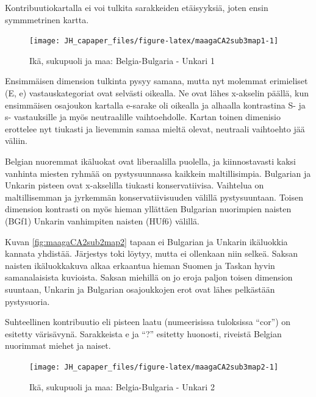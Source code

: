 \documentclass[
  finnish,
]{book}
\begin{document}
Kontribuutiokartalla ei voi tulkita sarakkeiden etäisyyksiä, joten ensin symmmetrinen kartta.

\begin{figure}

{\centering \texttt{[image: JH\_capaper\_files/figure-latex/maagaCA2sub3map1-1]} 

}

\caption{Ikä, sukupuoli ja maa: Belgia-Bulgaria - Unkari 1}\label{fig:maagaCA2sub3map1}
\end{figure}

Ensimmäisen dimension tulkinta pysyy samana, mutta nyt molemmat erimieliset
(E, e) vastauskategoriat ovat selvästi oikealla. Ne ovat lähes x-akselin päällä,
kun ensimmäisen osajoukon kartalla e-sarake oli oikealla ja alhaalla kontrastina
S- ja s- vastauksille ja myös neutraalille vaihtoehdolle. Kartan toinen dimenisio
erottelee nyt tiukasti ja lievemmin samaa mieltä olevat, neutraali vaihtoehto
jää väliin.

Belgian nuoremmat ikäluokat ovat liberaalilla puolella, ja kiinnostavasti
kaksi vanhinta miesten ryhmää on pystysuunnassa kaikkein maltillisimpia.
Bulgarian ja Unkarin pisteen ovat x-akselilla tiukasti konservatiivisa.
Vaihtelua on maltillisemman ja jyrkemmän konservatiivisuuden välillä
pystysuuntaan. Toisen dimension kontrasti on myös hieman yllättäen
Bulgarian nuorimpien naisten (BGf1) Unkarin vanhimpiten naisten (HUf6)
välillä.

Kuvan \ref{fig:maagaCA2sub2map2} tapaan ei Bulgarian ja Unkarin
ikäluokkia kannata yhdistää. Järjestys toki löytyy, mutta ei ollenkaan
niin selkeä. Saksan naisten ikäluokkakuva alkaa erkaantua hieman Suomen ja Taskan
hyvin samanalaisista kuvioista. Saksan miehillä on jo eroja paljon toisen
dimension suuntaan, Unkarin ja Bulgarian osajoukkojen erot ovat lähes
pelkästään pystysuoria.

Suhteellinen kontribuutio eli pisteen laatu (numeerisissa
tuloksissa ``cor'') on esitetty värisävynä. Sarakkeista e ja ``?'' esitetty
huonosti, riveistä Belgian nuorimmat miehet ja naiset.

\begin{figure}

{\centering \texttt{[image: JH\_capaper\_files/figure-latex/maagaCA2sub3map2-1]} 

}

\caption{Ikä, sukupuoli ja maa: Belgia-Bulgaria - Unkari 2}\label{fig:maagaCA2sub3map2}
\end{figure}
\end{document}
